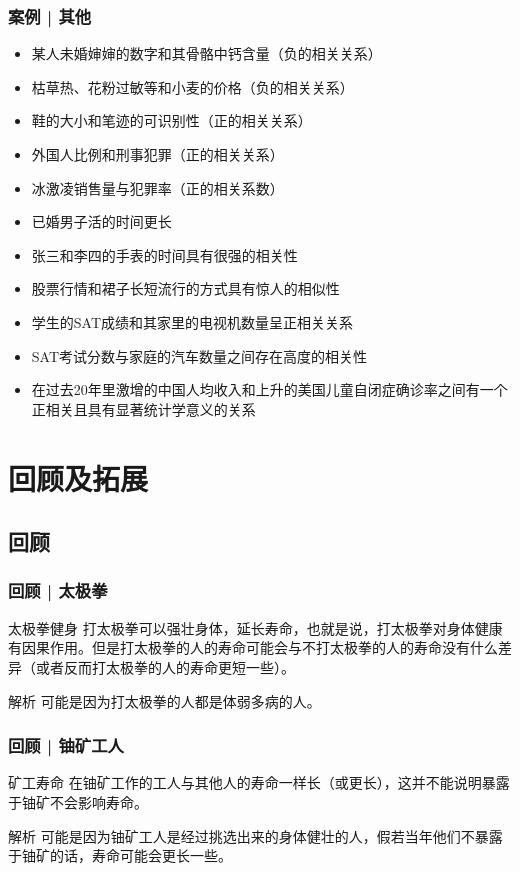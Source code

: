 \begin{frame}
  \frametitle{案例 | 其他}
  \begin{itemize}
    \item 某人未婚婶婶的数字和其骨骼中钙含量（负的相关关系）
    \item 枯草热、花粉过敏等和小麦的价格（负的相关关系）
    \item 鞋的大小和笔迹的可识别性（正的相关关系）
    \item 外国人比例和刑事犯罪（正的相关关系）
    \item 冰激凌销售量与犯罪率（正的相关系数）
    \item 已婚男子活的时间更长
    \item 张三和李四的手表的时间具有很强的相关性
    \item 股票行情和裙子长短流行的方式具有惊人的相似性
    \item 学生的SAT成绩和其家里的电视机数量呈正相关关系
    \item SAT考试分数与家庭的汽车数量之间存在高度的相关性
    \item 在过去20年里激增的中国人均收入和上升的美国儿童自闭症确诊率之间有一个正相关且具有显著统计学意义的关系
  \end{itemize}
\end{frame}

\section{回顾及拓展}
\subsection{回顾}
\begin{frame}
  \frametitle{回顾 | 太极拳}
  \begin{block}{太极拳健身}
打太极拳可以强壮身体，延长寿命，也就是说，打太极拳对身体健康有因果作用。但是打太极拳的人的寿命可能会与不打太极拳的人的寿命没有什么差异（或者反而打太极拳的人的寿命更短一些）。
  \end{block}
  \pause \pause \pause \pause
  \begin{block}{解析}
    可能是因为打太极拳的人都是体弱多病的人。
  \end{block}
\end{frame}

\begin{frame}
  \frametitle{回顾 | 铀矿工人}
  \begin{block}{矿工寿命}
    在铀矿工作的工人与其他人的寿命一样长（或更长），这并不能说明暴露于铀矿不会影响寿命。
  \end{block}
  \pause \pause \pause \pause
  \begin{block}{解析}
    可能是因为铀矿工人是经过挑选出来的身体健壮的人，假若当年他们不暴露于铀矿的话，寿命可能会更长一些。
  \end{block}
\end{frame}

